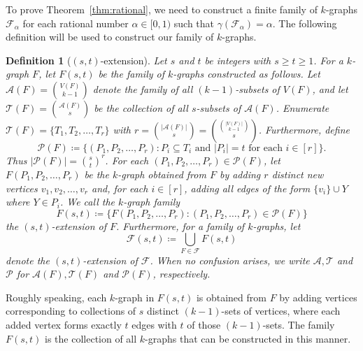 \documentclass[11pt,a4paper]{article}
\newtheorem{definition}{Definition} [section]
\theoremstyle{remark}
\begin{document}
To prove Theorem~\ref{thm:rational}, we need to construct a finite family of $k$-graphs $\mathcal{F}_{\alpha}$ for each rational number $\alpha \in [0,1)$ such that $\gamma(\mathcal{F}_{\alpha}) =\alpha$. The following definition will be used to construct our family of  $k$-graphs.

\begin{definition}[$(s,t)$-extension]
Let $s$ and $t$ be integers with $s \ge t \ge 1$.
For a $k$-graph $F$, let $F(s,t)$ be the family of $k$-graphs constructed as follows. Let $\mathcal{A}(F)= \binom{V(F)}{k-1}$ denote the family of all $(k-1)$-subsets of $V(F)$, and let $\mathcal{T}(F) = \binom{\mathcal{A}(F)}{s}$ be the collection of all $s$-subsets of $\mathcal{A}(F)$. Enumerate $\mathcal{T}(F) = \{T_1,T_2,\dots,T_r\}$ with $r = \binom{|\mathcal{A}(F)|}{s} = \binom{\binom{|V(F)|}{k-1}}{s}$.
Furthermore, define \[
\mathcal{P}(F)\coloneqq\{(P_1,P_2,\dots, P_r): P_i \subseteq T_i \text{ and } |P_i|=t \text{ for each } i\in [r]\}.
\] 
Thus $|\mathcal{P}(F)|=\binom{s}{t}^r$. For each $(P_1,P_2,\dots, P_r) \in \mathcal{P}(F)$, let $F(P_1,P_2,\dots, P_r)$ be the $k$-graph obtained from $F$ by adding $r$ distinct new vertices $v_1, v_2, \dots, v_r$ and, for each $i\in[r]$, adding all edges of the form $\{v_i\} \cup Y$ where $Y\in P_i$. We call the $k$-graph family
\[
F(s,t)\coloneqq \big\{F(P_1,P_2,\dots, P_r):(P_1,P_2,\dots, P_r) \in \mathcal{P}(F) \big\}
\]
 the \emph{$(s,t)$-extension} of $F$. Furthermore, for a family of $k$-graphs, let 
\[\mathcal{F}(s,t) \coloneqq \bigcup_{F\in \mathcal{F}} F(s,t)\] denote the \emph{$(s,t)$-extension} of $\mathcal{F}$. When no confusion arises, we write $\mathcal{A},\mathcal{T}$ and $\mathcal{P}$ for $\mathcal{A}(F),\mathcal{T}(F) $ and $\mathcal{P}(F)$, respectively.

\end{definition}

Roughly speaking, each $k$-graph in $F(s,t)$ is obtained from $F$ by adding vertices corresponding to collections of $s$ distinct $(k-1)$-sets of vertices, where each added vertex forms exactly $t$ edges with $t$ of those $(k-1)$-sets. The family $F(s,t)$  is the collection of all $k$-graphs that can be constructed in this manner.
\end{document}
